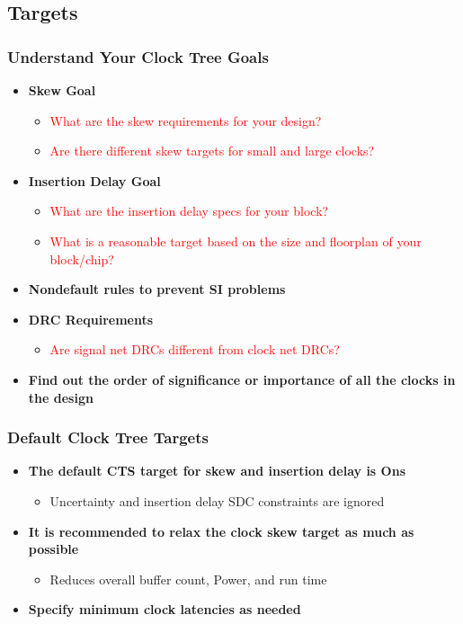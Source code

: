 \documentclass[compress]{beamer}
\begin{document}
\subsection[Targets]{Targets}
\begin{frame}
	\frametitle{Understand Your Clock Tree Goals}
	\begin{itemize}
		\item \textbf{Skew Goal}
		\begin{itemize}
			\item \textcolor{red}{What are the skew requirements for your design?}
			\item \textcolor{red}{Are there different skew targets for small and large clocks?}
		\end{itemize}
		\item \textbf{Insertion Delay Goal}
		\begin{itemize}
			\item \textcolor{red}{What are the insertion delay specs for your block?}
			\item \textcolor{red}{What is a reasonable target based on the size and floorplan
				of your block/chip?}
		\end{itemize}
		\item \textbf{Nondefault rules to prevent SI problems}
		\item \textbf{DRC Requirements}
		\begin{itemize}
			\item \textcolor{red}{Are signal net DRCs different from clock net DRCs?}
		\end{itemize}
		\item \textbf{Find out the order of significance or importance of all the clocks in the design}
	\end{itemize}
\end{frame}
\begin{frame}
	\frametitle{Default Clock Tree Targets}
	\begin{itemize}
		\item \textbf{The default CTS target for skew and insertion
		delay is Ons}
		\begin{itemize}
			\item Uncertainty and insertion delay SDC constraints are	ignored
		\end{itemize}
		\item \textbf{It is recommended to relax the clock skew target
		as much as possible}
	\begin{itemize}
		\item  Reduces overall buffer count, Power, and run time
	\end{itemize}
		\item \textbf{Specify minimum clock latencies as needed}
	\end{itemize}
\end{frame}
\end{document}
